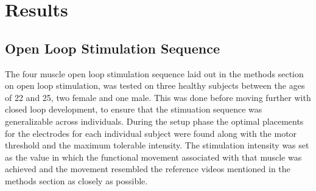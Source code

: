 




\section{Results}

\subsection{Open Loop Stimulation Sequence}
The four muscle open loop stimulation sequence laid out in the methods section on open loop stimulation, was tested on three healthy subjects between the ages of 22 and 25, two female and one male. This was done before moving further with closed loop development, to ensure that the stimuation sequence was generalizable across individuals. During the setup phase the optimal placements for the electrodes for each individual subject were found along with the motor threshold and the maximum tolerable intensity. The stimulation intensity was set as the value in which the functional movement associated with that muscle was achieved and the movement resembled the reference videos mentioned in the methods section as closely as possible.

